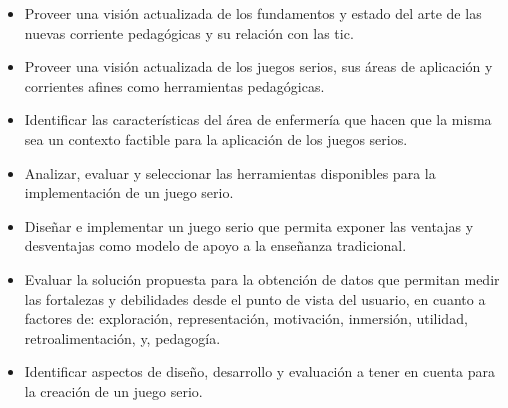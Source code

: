 \begin{itemize}

    \item Proveer una visión actualizada de los fundamentos y estado del arte de
        las nuevas corriente pedagógicas y su relación con las \Gls{tic}.

    \item Proveer una visión actualizada de los juegos serios, sus áreas de
        aplicación y corrientes afines como herramientas pedagógicas.
    
    \item Identificar las características del área de enfermería que hacen que
        la misma sea un contexto factible para la aplicación de los juegos
        serios.
    
    \item Analizar, evaluar y seleccionar las herramientas disponibles para la
        implementación de un juego serio.
        
    \item Diseñar e implementar un juego serio que permita exponer las ventajas
        y desventajas como modelo de apoyo a la enseñanza tradicional. 
        
    \item Evaluar la solución propuesta para la obtención de datos que permitan
        medir las fortalezas y debilidades desde el punto de vista del usuario,
        en cuanto a factores de: exploración, representación, motivación,
        inmersión, utilidad, retroalimentación, y, pedagogía.
         
     \item Identificar aspectos de diseño, desarrollo y evaluación a tener en
         cuenta para la creación de un juego serio.

\end{itemize}
